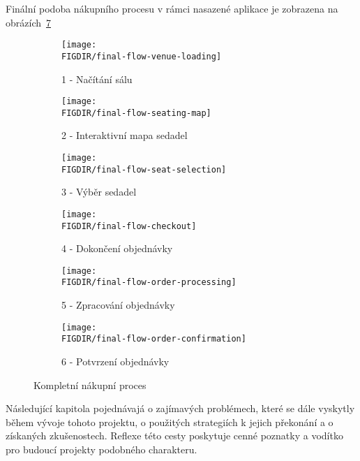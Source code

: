 Finální podoba nákupního procesu v rámci nasazené aplikace je zobrazena na obrázích~\ref{fig:final-flow}

\begin{figure}[h]
    \centering
    \hfill
    \begin{subfigure}{0.48\textwidth}
        \texttt{[image: \\FIGDIR/final-flow-venue-loading]}
        \caption{1 - Načítání sálu}
        \label{fig:final-flow-venue-loading}
    \end{subfigure}
    \hfill
    \begin{subfigure}{0.48\textwidth}
        \texttt{[image: \\FIGDIR/final-flow-seating-map]}
        \caption{2 - Interaktivní mapa sedadel}
        \label{fig:final-flow-seating-map}
    \end{subfigure}
    \hfill
    \begin{subfigure}{0.48\textwidth}
        \texttt{[image: \\FIGDIR/final-flow-seat-selection]}
        \caption{3 - Výběr sedadel}
        \label{fig:final-flow-seat-selection}
    \end{subfigure}
    \hfill
    \begin{subfigure}{0.48\textwidth}
        \texttt{[image: \\FIGDIR/final-flow-checkout]}
        \caption{4 - Dokončení objednávky}
        \label{fig:final-flow-checkout}
    \end{subfigure}
    \hfill
    \begin{subfigure}{0.48\textwidth}
        \texttt{[image: \\FIGDIR/final-flow-order-processing]}
        \caption{5 - Zpracování objednávky}
        \label{fig:final-flow-order-processing}
    \end{subfigure}
    \hfill
    \begin{subfigure}{0.48\textwidth}
        \texttt{[image: \\FIGDIR/final-flow-order-confirmation]}
        \caption{6 - Potvrzení objednávky}
        \label{fig:final-flow-order-confirmation}
    \end{subfigure}
    \caption{Kompletní nákupní proces}
    \label{fig:final-flow}
\end{figure}

Následující kapitola pojednávajá o zajímavých problémech, které se dále vyskytly během vývoje tohoto projektu, o použitých strategiích k jejich překonání a o získaných zkušenostech.
Reflexe této cesty poskytuje cenné poznatky a vodítko pro budoucí projekty podobného charakteru.
